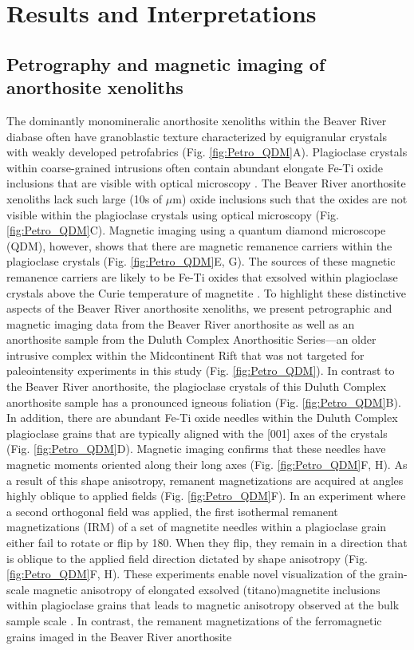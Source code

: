 \documentclass[9pt,twocolumn,twoside,lineno]{pnas-new}
\begin{document}
\section*{Results and Interpretations}

\subsection*{Petrography and magnetic imaging of anorthosite xenoliths}

The dominantly monomineralic anorthosite xenoliths within the Beaver River diabase often have granoblastic texture characterized by equigranular crystals with weakly developed petrofabrics (Fig. \ref{fig:Petro_QDM}A). Plagioclase crystals within coarse-grained intrusions often contain abundant elongate Fe-Ti oxide inclusions that are visible with optical microscopy \cite{Feinberg2006a, Wenk2011a, Ageeva2016a}. The Beaver River anorthosite xenoliths lack such large (10s of $\mu$m) oxide inclusions such that the oxides are not visible within the plagioclase crystals using optical microscopy (Fig. \ref{fig:Petro_QDM}C). Magnetic imaging using a quantum diamond microscope (QDM), however, shows that there are magnetic remanence carriers within the plagioclase crystals (Fig. \ref{fig:Petro_QDM}E, G). The sources of these magnetic remanence carriers are likely to be Fe-Ti oxides that exsolved within plagioclase crystals above the Curie temperature of magnetite \cite{Zhang2021b, Bian2021a}. To highlight these distinctive aspects of the Beaver River anorthosite xenoliths, we present petrographic and magnetic imaging data from the Beaver River anorthosite as well as an anorthosite sample from the Duluth Complex Anorthositic Series---an older intrusive complex within the Midcontinent Rift that was not targeted for paleointensity experiments in this study (Fig. \ref{fig:Petro_QDM}). In contrast to the Beaver River anorthosite, the plagioclase crystals of this Duluth Complex anorthosite sample has a pronounced igneous foliation (Fig. \ref{fig:Petro_QDM}B). In addition, there are abundant Fe-Ti oxide needles within the Duluth Complex plagioclase grains that are typically aligned with the [001] axes of the crystals (Fig. \ref{fig:Petro_QDM}D). Magnetic imaging confirms that these needles have magnetic moments oriented along their long axes (Fig. \ref{fig:Petro_QDM}F, H). As a result of this shape anisotropy, remanent magnetizations are acquired at angles highly oblique to applied fields (Fig. \ref{fig:Petro_QDM}F). In an experiment where a second orthogonal field was applied, the first isothermal remanent magnetizations (IRM) of a set of magnetite needles within a plagioclase grain either fail to rotate or flip by 180\textdegree. When they flip, they remain in a direction that is oblique to the applied field direction dictated by shape anisotropy (Fig. \ref{fig:Petro_QDM}F, H). These experiments enable novel visualization of the grain-scale magnetic anisotropy of elongated exsolved (titano)magnetite inclusions within plagioclase grains that leads to magnetic anisotropy observed at the bulk sample scale \cite{Selkin2000a, Feinberg2006a}. In contrast, the remanent magnetizations of the ferromagnetic grains imaged in the Beaver River anorthosite 
\end{document}
